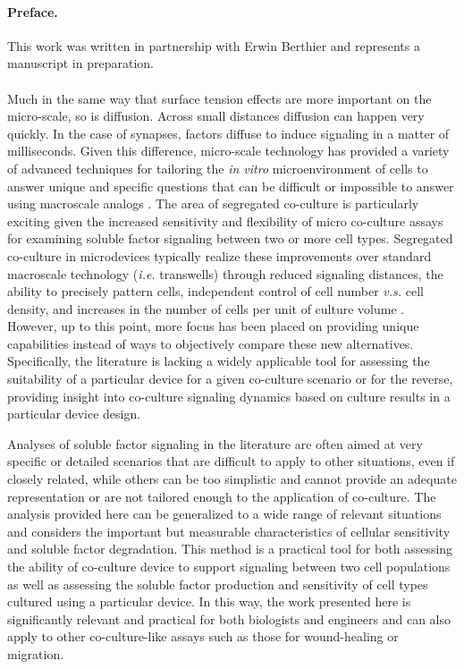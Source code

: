 \paragraph{Preface.}This work was written in partnership with Erwin Berthier and represents a manuscript in preparation.\\
\\
\noindent Much in the same way that surface tension effects are more important on the micro-scale, so is diffusion. Across small distances diffusion can happen very quickly. In the case of synapses, factors diffuse to induce signaling in a matter of milliseconds. Given this difference, micro-scale technology has provided a variety of advanced techniques for tailoring the \emph{in vitro} microenvironment of cells to answer unique and specific questions that can be difficult or impossible to answer using macroscale analogs \cite{Chen:1998xq,Lucchetta:2005kn}. The area of segregated co-culture is particularly exciting given the increased sensitivity and flexibility of micro co-culture assays for examining soluble factor signaling between two or more cell types. Segregated co-culture in microdevices typically realize these improvements over standard macroscale technology (\emph{i.e.} transwells) through reduced signaling distances, the ability to precisely pattern cells, independent control of cell number \emph{v.s.} cell density, and increases in the number of cells per unit of culture volume \cite{Bhatia:1999ta,Domenech:2009jt,Folch:2000tb,Nelson:2002ev}. However, up to this point, more focus has been placed on providing unique capabilities instead of ways to objectively compare these new alternatives. Specifically, the literature is lacking a widely applicable tool for assessing the suitability of a particular device for a given co-culture scenario or for the reverse, providing insight into co-culture signaling dynamics based on culture results in a particular device design.

Analyses of soluble factor signaling in the literature are often aimed at very specific or detailed scenarios that are difficult to apply to other situations, even if closely related, while others can be too simplistic and cannot provide an adequate representation or are not tailored enough to the application of co-culture. The analysis provided here can be generalized to a wide range of relevant situations and considers the important but measurable characteristics of cellular sensitivity and soluble factor degradation. This method is a practical tool for both assessing the ability of co-culture device to support signaling between two cell populations as well as assessing the soluble factor production and sensitivity of cell types cultured using a particular device. In this way, the work presented here is significantly relevant and practical for both biologists and engineers and can also apply to other co-culture-like assays such as those for wound-healing or migration.


